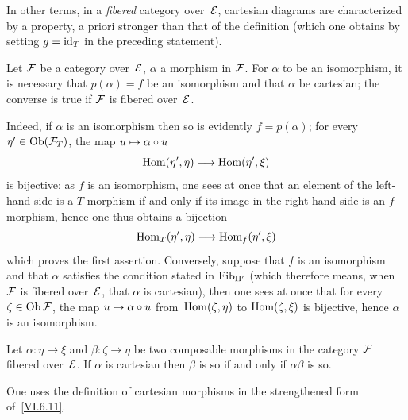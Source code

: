 In other terms, in a \emph{fibered} category
over~$\cal{E}$, cartesian diagrams are characterized
by a property, a priori stronger than that of the
definition (which one obtains by setting $g=\id_T$ in
the preceding statement).
\begin{corollary}
\label{VI.6.12} Let $\cal{F}$ be a category over~$\cal{E}$,
$\alpha$ a morphism in $\cal{F}$. For $\alpha$ to be an
isomorphism, it is necessary that $p(\alpha)=f$ be an isomorphism and that
$\alpha$ be cartesian; the converse is true if $\cal{F}$
is fibered over~$\cal{E}$.
\end{corollary}

Indeed, if $\alpha$ is an isomorphism then so is evidently
$f=p(\alpha)$; for every
$\eta'\in\Ob(\cal{F}_T)$,
the map $u\mto \alpha\circ u$
$$
\Hom(\eta',\eta)\to \Hom(\eta',\xi)
$$
is bijective; as $f$ is an isomorphism, one sees at once
that an
element of the left-hand side is a $T$-morphism if and only
if its image in the right-hand side is an $f$-morphism, hence one thus obtains a bijection
$$
\Hom_T(\eta',\eta)\to\Hom_f(\eta',\xi)
$$
which
proves the first assertion. Conversely, suppose
that $f$ is an isomorphism and that $\alpha$ satisfies the condition
stated in $\Fib_{\mathrm{II}'}$ (which therefore means,
when $\cal{F}$ is
fibered
over~$\cal{E}$, that $\alpha$ is cartesian), then one sees at
once that for every $\zeta\in\Ob\cal{F}$, the map $u\mto
\alpha\circ u$ from~$\Hom(\zeta,\eta)$ to $\Hom(\zeta,\xi)$ is
bijective, hence $\alpha$ is an isomorphism.
\begin{corollary}
\label{VI.6.13} Let $\alpha\colon\eta\to\xi$ and
$\beta\colon\zeta\to \eta$ be two composable morphisms in the
category $\cal{F}$ fibered over~$\cal{E}$. If $\alpha$ is
cartesian then $\beta$ is so if and only if $\alpha\beta$
is so.
\end{corollary}

One uses the definition of cartesian morphisms in the
strengthened form of~\ref{VI.6.11}.

